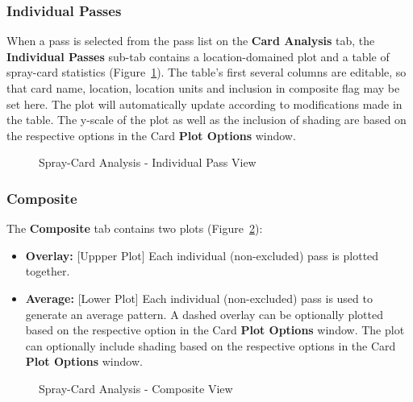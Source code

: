 \documentclass[10pt,letterpaper,titlepage]{article}
\begin{document}
    \subsubsection{Individual Passes}
    When a pass is selected from the pass list on the \textbf{Card Analysis} tab, the \textbf{Individual Passes} sub-tab contains a location-domained plot and a table of spray-card statistics (Figure~\ref{fig:card_individual_pass}). The table's first several columns are editable, so that card name, location, location units and inclusion in composite flag may be set here. The plot will automatically update according to modifications made in the table. The y-scale of the plot as well as the inclusion of shading are based on the respective options in the Card \textbf{Plot Options} window.

    \begin{figure}[hb]
        \centering
        \caption{Spray-Card Analysis - Individual Pass View}
        \label{fig:card_individual_pass}
    \end{figure}
    \FloatBarrier
    \newpage

    \subsubsection{Composite}
    The \textbf{Composite} tab contains two plots (Figure~\ref{fig:card_composite}):
    \begin{itemize}
        \item \textbf{Overlay:} [Uppper Plot] Each individual (non-excluded) pass is plotted together.
        \item \textbf{Average:} [Lower Plot] Each individual (non-excluded) pass is used to generate an average pattern.  A dashed overlay can be optionally plotted based on the respective option in the Card \textbf{Plot Options} window. The plot can optionally include shading based on the respective options in the Card \textbf{Plot Options} window.
    \end{itemize}
    \begin{figure}[hb]
        \centering
        \caption{Spray-Card Analysis - Composite View}
        \label{fig:card_composite}
    \end{figure}
    \FloatBarrier
    \newpage
\end{document}
